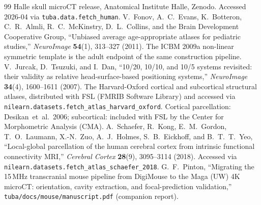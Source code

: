 \documentclass{compactarticle}
\begin{document}
\begin{thebibliography}{99}
Halle skull microCT release, Anatomical Institute Halle, Zenodo.
Accessed 2026-04 via \texttt{tuba.data.fetch\_human}.
V.~Fonov, A.~C.~Evans, K.~Botteron, C.~R.~Almli, R.~C.~McKinstry,
D.~L.~Collins, and the Brain Development Cooperative Group,
``Unbiased average age-appropriate atlases for pediatric studies,''
{\em NeuroImage} {\bf 54}(1), 313--327 (2011).
The ICBM 2009a non-linear symmetric template is the adult endpoint
of the same construction pipeline.
V.~Jurcak, D.~Tsuzuki, and I.~Dan,
``10/20, 10/10, and 10/5 systems revisited: their validity as
relative head-surface-based positioning systems,''
{\em NeuroImage} {\bf 34}(4), 1600--1611 (2007).
The Harvard-Oxford cortical and subcortical structural atlases,
distributed with FSL (FMRIB Software Library) and accessed via
\texttt{nilearn.datasets.fetch\_atlas\_harvard\_oxford}. Cortical
parcellation: Desikan~et~al.\ 2006; subcortical: included with
FSL by the Center for Morphometric Analysis (CMA).
A.~Schaefer, R.~Kong, E.~M.~Gordon, T.~O.~Laumann, X.-N.~Zuo,
A.~J.~Holmes, S.~B.~Eickhoff, and B.~T.~T.~Yeo,
``Local-global parcellation of the human cerebral cortex from
intrinsic functional connectivity MRI,''
{\em Cerebral Cortex} {\bf 28}(9), 3095--3114 (2018).
Accessed via \texttt{nilearn.datasets.fetch\_atlas\_schaefer\_2018}.
G.~F.~Pinton, ``Migrating the 15\,MHz transcranial mouse pipeline
from DigiMouse to the Maga (UW) 4K microCT: orientation, cavity
extraction, and focal-prediction validation,''
\texttt{tuba/docs/mouse/manuscript.pdf} (companion report).
\end{thebibliography}
\end{document}

